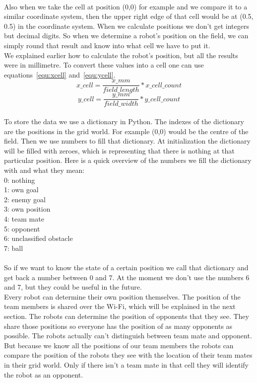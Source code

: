 \documentclass[lnicst,a4paper]{svmultln}
\begin{document}
\\
Also when we take the cell at position (0,0) for example and we compare it to a similar coordinate system, then the upper right edge of that cell would be at (0.5, 0.5) in the coordinate system. When we calculate positions we don't get integers but decimal digits. 
So when we determine a robot's position on the field, we can simply round that result and know into what cell we have to put it.
\\
We explained earlier how to calculate the robot's position, but all the results were in millimetre. To convert these values into a cell one can use equations~\ref{equ:xcell} and~\ref{equ:ycell}.
\begin{equation}
	x\_cell = \frac{x\_mm}{field\_length} * x\_cell\_count
	\label{equ:xcell}
\end{equation}
\begin{equation}
	y\_cell = \frac{y\_mm}{field\_width} * y\_cell\_count
	\label{equ:ycell}
\end{equation}
\\
To store the data we use a dictionary in Python. The indexes of the dictionary are the positions in the grid world. For example (0,0) would be the centre of the field. Then we use numbers to fill that dictionary. At initialization the dictionary will be filled with zeroes, which is representing that there is nothing at that particular position. Here is a quick overview of the numbers we fill the dictionary with and what they mean:\\
0: nothing\\
1: own goal\\
2: enemy goal\\
3: own position\\
4: team mate\\
5: opponent\\
6: unclassified obstacle\\
7: ball\\
\\
So if we want to know the state of a certain position we call that dictionary and get back a number between 0 and 7. At the moment we don't use the numbers 6 and 7, but they could be useful in the future.
\\
Every robot can determine their own position themselves. The position of the team members is shared over the Wi-Fi, which will be explained in the next section. The robots can determine the position of opponents that they see. They share those positions so everyone has the position of as many opponents as possible. The robots actually can't distinguish between team mate and opponent. But because we know all the positions of our team members the robots can compare the position of the robots they see with the location of their team mates in their grid world. Only if there isn't a team mate in that cell they will identify the robot as an opponent. 
\end{document}
